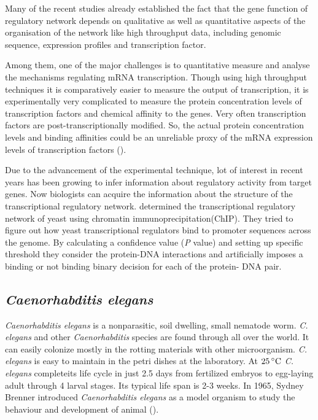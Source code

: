 Many of the recent studies already established the fact that the gene function of regulatory network depends on qualitative as well as quantitative aspects of the organisation of the network like high throughput data, including genomic sequence, expression profiles and transcription factor.

Among them, one of the major challenges is to quantitative measure and analyse the mechanisms regulating mRNA transcription. Though using high throughput techniques it is comparatively easier to measure the output of transcription, it is experimentally very complicated to measure the protein concentration levels of transcription factors and chemical affinity to the genes. Very often transcription factors are post-transcriptionally modified. So, the actual protein concentration levels and binding affinities could be an unreliable proxy of the mRNA expression levels of transcription factors (\cite{Sanguinetti:2006}).

Due to the advancement of the experimental technique, lot of interest in recent years has been growing to infer information about regulatory activity from target genes. Now biologists can acquire the information about the structure of the transcriptional regulatory network. \cite{Lee:2002} determined the transcriptional regulatory network of yeast using chromatin immunoprecipitation(ChIP). They tried to figure out how yeast transcriptional regulators bind to promoter sequences across the genome. By calculating a confidence value (\textit{P} value) and setting up specific threshold they consider the protein-DNA interactions and artificially imposes a binding or not binding binary decision for each of the protein- DNA pair.

\subsection{\textit{Caenorhabditis elegans}}
\textit{Caenorhabditis elegans} is a nonparasitic, soil dwelling, small nematode worm. \textit{C. elegans} and other \textit{Caenorhabditis} species are found through all over the world. It can easily colonize mostly in the rotting materials with other microorganism. \textit{C. elegans} is easy to maintain in the petri dishes at the laboratory. At $25\,^{\circ}{\rm C}$ \textit{C. elegans} completeits life cycle in just 2.5 days from fertilized embryos to egg-laying adult through 4 larval stages. Its typical life span is 2-3 weeks. In 1965, Sydney Brenner introduced \textit{Caenorhabditis elegans} as a model organism to study the behaviour and development of animal (\cite{Brenner:1974}).

